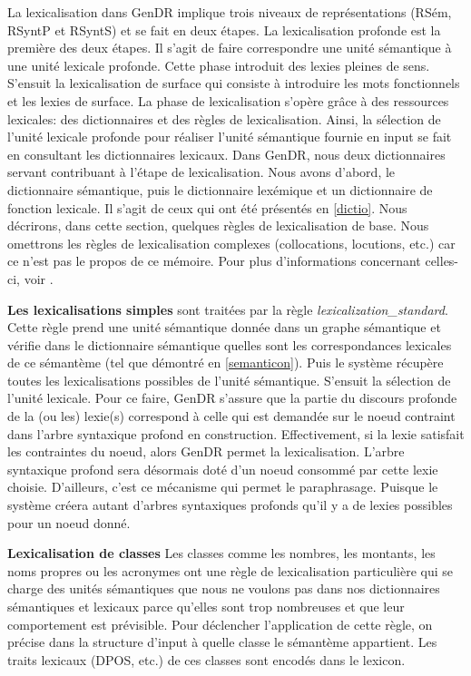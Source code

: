 
La lexicalisation dans GenDR implique trois niveaux de représentations (RSém, RSyntP et RSyntS) et se fait en deux étapes. La lexicalisation profonde est la première des deux étapes. Il s'agit de faire correspondre une unité sémantique à une unité lexicale profonde. Cette phase introduit des lexies pleines de sens. S'ensuit la lexicalisation de surface qui consiste à introduire les mots fonctionnels et les lexies de surface. La phase de lexicalisation s'opère grâce à des ressources lexicales: des dictionnaires et des règles de lexicalisation. Ainsi, la sélection de l'unité lexicale profonde pour réaliser l'unité sémantique fournie en input se fait en consultant les dictionnaires lexicaux. Dans GenDR, nous deux dictionnaires servant contribuant à l'étape de lexicalisation. Nous avons d'abord, le dictionnaire sémantique, puis le dictionnaire lexémique et un dictionnaire de fonction lexicale. Il s'agit de ceux qui ont été présentés en \ref{dictio}.  Nous décrirons, dans cette section, quelques règles de lexicalisation de base. Nous omettrons les règles de lexicalisation complexes (collocations, locutions, etc.) car ce n'est pas le propos de ce mémoire. Pour plus d'informations concernant celles-ci, voir \cite{lambrey15,LambreyImplementationcollocationspour2017,dubinskaite17,lareau18}.

\textbf{Les lexicalisations simples}
sont traitées par la règle \emph{lexicalization\_standard}. Cette règle prend une unité sémantique donnée dans un graphe sémantique et vérifie dans le dictionnaire sémantique quelles sont les correspondances lexicales de ce sémantème (tel que démontré en \ref{semanticon}). Puis le système récupère toutes les lexicalisations possibles de l'unité sémantique. S'ensuit la sélection de l'unité lexicale. Pour ce faire, GenDR s'assure que la partie du discours profonde de la (ou les) lexie(s) correspond à celle qui est demandée sur le noeud contraint dans l'arbre syntaxique profond en construction. Effectivement, si la lexie satisfait les contraintes du noeud, alors GenDR permet la lexicalisation. L'arbre syntaxique profond sera désormais doté d'un noeud consommé par cette lexie choisie. D'ailleurs, c'est ce mécanisme qui permet le paraphrasage. Puisque le système créera autant d'arbres syntaxiques profonds qu'il y a de lexies possibles pour un noeud donné. 

\textbf{Lexicalisation de classes}
Les classes comme les nombres, les montants, les noms propres ou les acronymes ont une règle de lexicalisation particulière qui se charge des unités sémantiques que nous ne voulons pas dans nos dictionnaires sémantiques et lexicaux parce qu'elles sont trop nombreuses et que leur comportement est prévisible. Pour déclencher l'application de cette règle, on précise dans la structure d'input à quelle classe le sémantème appartient. Les traits lexicaux (DPOS, etc.) de ces classes sont encodés dans le lexicon.

